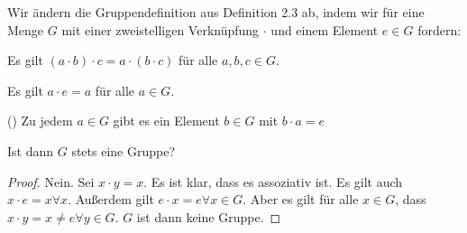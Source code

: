 \begin{Problem}
	Wir ändern die Gruppendefinition aus Definition 2.3 ab, indem wir für eine Menge $G$ mit einer zweistelligen Verknüpfung $\cdot$ und einem Element $e\in G$ fordern:
	\begin{parts}
		\item Es gilt $(a\cdot b)\cdot c=a\cdot(b\cdot c)$ für alle $a,b,c\in G$.	
		\item Es gilt $a\cdot e=a$ für alle $a\in G$.
 \item[\refstepcounter{enumi}(\alph{enumi}\textquotesingle)] Zu jedem $a \in G$ gibt es ein Element $b\in G$ mit $b\cdot a = e$
	\end{parts}
Ist dann $G$ stets eine Gruppe?
\end{Problem}
\begin{proof}
	Nein. Sei $x\cdot y=x$. Es ist klar, dass es assoziativ ist. Es gilt auch $x\cdot e=x\forall x$. Außerdem gilt $e\cdot x=e\forall x\in G$. 
	Aber es gilt f\"{u}r alle $x\in G$, dass $x\cdot y=x\neq e\forall y \in G$. $G$ ist dann keine Gruppe.
\end{proof}

